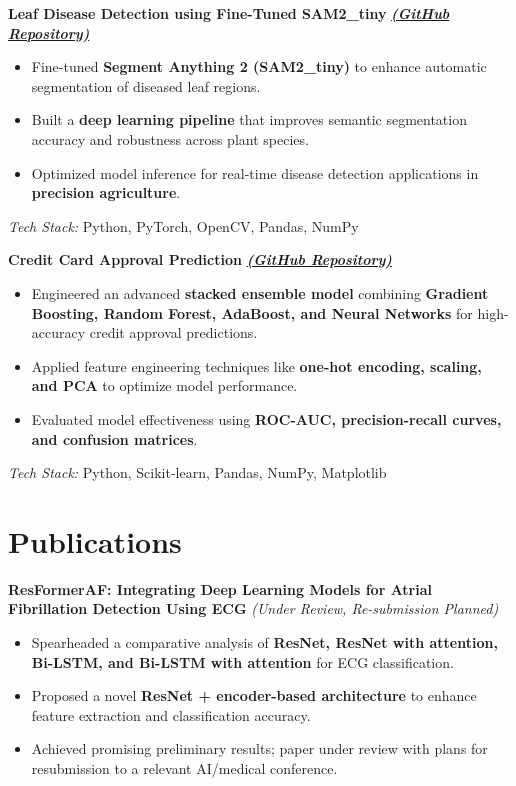 \documentclass[10pt, letterpaper]{article}
\begin{document}
\textbf{Leaf Disease Detection using Fine-Tuned SAM2\_tiny} 
\hfill \href{https://github.com/astroanand-6e/SAM2_Leaf_Disease_Segmentation}{\textbf{\textit{(GitHub Repository)}}} \\
\begin{itemize}
    \item Fine-tuned \textbf{Segment Anything 2 (SAM2\_tiny)} to enhance automatic segmentation of diseased leaf regions.
    \item Built a \textbf{deep learning pipeline} that improves semantic segmentation accuracy and robustness across plant species.
    \item Optimized model inference for real-time disease detection applications in \textbf{precision agriculture}.
\end{itemize}
\textit{Tech Stack:} Python, PyTorch, OpenCV, Pandas, NumPy

\textbf{Credit Card Approval Prediction} 
\hfill \href{https://github.com/astroanand-6e/Credit-Card-Approval-Prediction}{\textbf{\textit{(GitHub Repository)}}} \\
\begin{itemize}
    \item Engineered an advanced \textbf{stacked ensemble model} combining \textbf{Gradient Boosting, Random Forest, AdaBoost, and Neural Networks} for high-accuracy credit approval predictions.
    \item Applied feature engineering techniques like \textbf{one-hot encoding, scaling, and PCA} to optimize model performance.
    \item Evaluated model effectiveness using \textbf{ROC-AUC, precision-recall curves, and confusion matrices}.
\end{itemize}
\textit{Tech Stack:} Python, Scikit-learn, Pandas, NumPy, Matplotlib

\section{Publications}

\textbf{ResFormerAF: Integrating Deep Learning Models for Atrial Fibrillation Detection Using ECG} \textit{(Under Review, Re-submission Planned)} \\
\begin{itemize}
    \item Spearheaded a comparative analysis of \textbf{ResNet, ResNet with attention, Bi-LSTM, and Bi-LSTM with attention} for ECG classification.
    \item Proposed a novel \textbf{ResNet + encoder-based architecture} to enhance feature extraction and classification accuracy.
    \item Achieved promising preliminary results; paper under review with plans for resubmission to a relevant AI/medical conference.
\end{itemize}
\end{document}
